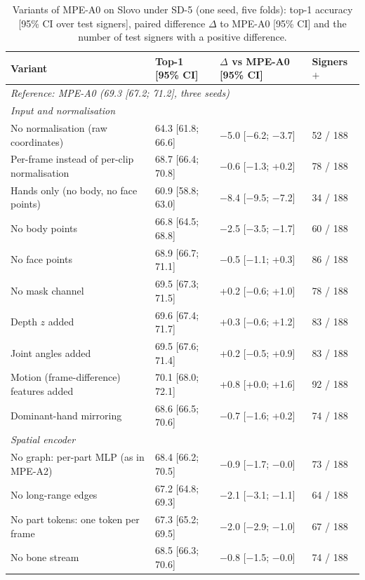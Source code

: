 \documentclass[a4paper,10pt]{article}
\begin{document}
\begin{table}[H]
\caption{Variants of MPE-A0 on Slovo under SD-5 (one seed, five folds): top-1 accuracy [95\% CI over test signers], paired difference $\Delta$ to MPE-A0 [95\% CI] and the number of test signers with a positive difference.}\label{tab:s_abl}
\centering
\footnotesize
\begin{tabular}{llll}
\toprule
\textbf{Variant} & \textbf{Top-1 [95\% CI]} & \textbf{$\Delta$ vs MPE-A0 [95\% CI]} & \textbf{Signers $+$} \\
\midrule
\multicolumn{4}{l}{\textit{Reference: MPE-A0 (69.3 [67.2; 71.2], three seeds)}} \\
\multicolumn{4}{l}{\textit{Input and normalisation}} \\
No normalisation (raw coordinates) & 64.3 [61.8; 66.6] & $-$5.0 [$-$6.2; $-$3.7] & 52 / 188 \\
Per-frame instead of per-clip normalisation & 68.7 [66.4; 70.8] & $-$0.6 [$-$1.3; +0.2] & 78 / 188 \\
Hands only (no body, no face points) & 60.9 [58.8; 63.0] & $-$8.4 [$-$9.5; $-$7.2] & 34 / 188 \\
No body points & 66.8 [64.5; 68.8] & $-$2.5 [$-$3.5; $-$1.7] & 60 / 188 \\
No face points & 68.9 [66.7; 71.1] & $-$0.5 [$-$1.1; +0.3] & 86 / 188 \\
No mask channel & 69.5 [67.3; 71.5] & +0.2 [$-$0.6; +1.0] & 78 / 188 \\
Depth $z$ added & 69.6 [67.4; 71.7] & +0.3 [$-$0.6; +1.2] & 83 / 188 \\
Joint angles added & 69.5 [67.6; 71.4] & +0.2 [$-$0.5; +0.9] & 83 / 188 \\
Motion (frame-difference) features added & 70.1 [68.0; 72.1] & +0.8 [+0.0; +1.6] & 92 / 188 \\
Dominant-hand mirroring & 68.6 [66.5; 70.6] & $-$0.7 [$-$1.6; +0.2] & 74 / 188 \\
\multicolumn{4}{l}{\textit{Spatial encoder}} \\
No graph: per-part MLP (as in MPE-A2) & 68.4 [66.2; 70.5] & $-$0.9 [$-$1.7; $-$0.0] & 73 / 188 \\
No long-range edges & 67.2 [64.8; 69.3] & $-$2.1 [$-$3.1; $-$1.1] & 64 / 188 \\
No part tokens: one token per frame & 67.3 [65.2; 69.5] & $-$2.0 [$-$2.9; $-$1.0] & 67 / 188 \\
No bone stream & 68.5 [66.3; 70.6] & $-$0.8 [$-$1.5; $-$0.0] & 74 / 188 \\

\end{tabular}
\end{table}
\end{document}
